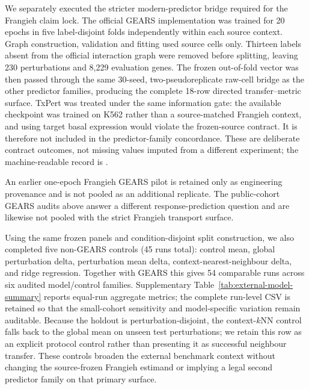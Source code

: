 \documentclass{article}
\begin{document}


We separately executed the stricter modern-predictor bridge required for the
Frangieh claim lock. The official GEARS implementation was trained for 20
epochs in five label-disjoint folds independently within each source context.
Graph construction, validation and fitting used source cells only. Thirteen
labels absent from the official interaction graph were removed before
splitting, leaving 230 perturbations and 8,229 evaluation genes. The frozen
out-of-fold vector was then passed through the same 30-seed,
two-pseudoreplicate raw-cell bridge as the other predictor families, producing
the complete 18-row directed transfer--metric surface.
TxPert was treated under the same information gate: the available checkpoint
was trained on K562 rather than a source-matched Frangieh context, and using
target basal expression would violate the frozen-source contract. It is
therefore not included in the predictor-family concordance. These are
deliberate contract outcomes, not missing values imputed from a different
experiment; the machine-readable record is
.

An earlier one-epoch Frangieh GEARS pilot is retained only as engineering
provenance and is not pooled as an additional replicate. The public-cohort
GEARS audits above answer a different response-prediction question and are
likewise not pooled with the strict Frangieh transport surface.

Using the same frozen panels and condition-disjoint split construction, we also completed five
non-GEARS controls (45 runs total): control mean, global perturbation delta,
perturbation mean delta, context-nearest-neighbour delta, and ridge
regression. Together with GEARS this gives 54 comparable runs across six
audited model/control families. Supplementary Table~\ref{tab:external-model-summary} reports
equal-run aggregate metrics; the complete run-level CSV is retained so that
the small-cohort sensitivity and model-specific variation remain auditable.
Because the holdout is perturbation-disjoint, the context-$k$NN control falls
back to the global mean on unseen test perturbations; we retain this row as an
explicit protocol control rather than presenting it as successful neighbour
transfer. These controls broaden the external benchmark context without
changing the source-frozen Frangieh estimand or implying a legal second
predictor family on that primary surface.


\end{document}
